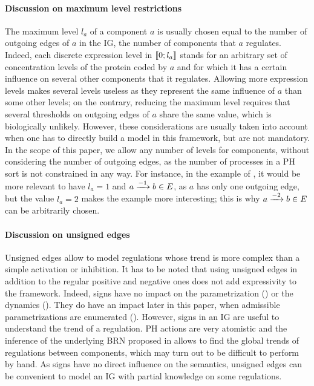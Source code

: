 \paragraph{Discussion on maximum level restrictions}
The maximum level $l_a$ of a component $a$ is usually chosen equal to the number of outgoing edges of $a$ in the IG, \ie the number of components that $a$ regulates.
Indeed, each discrete expression level in $\llbracket 0 ; l_a \rrbracket$ stands for an arbitrary set of concentration levels of the protein coded by $a$
and for which it has a certain influence on several other components that it regulates.
Allowing more expression levels makes several levels useless as they represent the same influence of $a$ than some other levels;
on the contrary, reducing the maximum level requires that several thresholds on outgoing edges of $a$ share the same value, which is biologically unlikely.
However, these considerations are usually taken into account when one has to directly build a model in this framework, but are not mandatory.
In the scope of this paper, we allow any number of levels for components, without considering the number of outgoing edges,
as the number of processes in a PH sort is not constrained in any way.
For instance, in the example of ,
it would be more relevant to have $l_a = 1$ and $a \xrightarrow{- 1} b \in E$, as $a$ has only one outgoing edge,
but the value $l_a = 2$ makes the example more interesting; this is why $a \xrightarrow{- 2} b \in E$ can be arbitrarily chosen.

\paragraph{Discussion on unsigned edges}
Unsigned edges allow to model regulations whose trend is more complex than a simple activation or inhibition.
It has to be noted that using unsigned edges in addition to the regular positive and negative ones does not add expressivity to the framework.
Indeed, signs have no impact on the parametrization () or the dynamics ().
They do have an impact later in this paper, when admissible parametrizations are enumerated ().
However, signs in an IG are useful to understand the trend of a regulation.
PH actions are very atomistic and the inference of the underlying BRN proposed in 
allows to find the global trends of regulations between components,
which may turn out to be difficult to perform by hand.
As signs have no direct influence on the semantics, unsigned edges can be convenient to model an IG with partial knowledge on some regulations.

